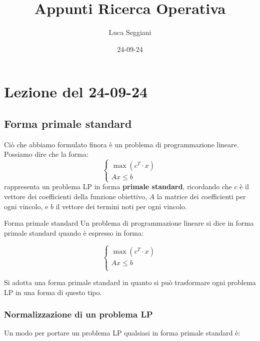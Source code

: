 \documentclass[a4paper,11pt]{article}
\title{Appunti Ricerca Operativa}
\author{Luca Seggiani}
\date{24-09-24}
\begin{document}
\section{Lezione del 24-09-24}

\thispagestyle{empty}
\pagestyle{fancy}


\subsection{Forma primale standard}
Ciò che abbiamo formulato finora è un problema di programmazione lineare.
Possiamo dire che la forma:
\[
	\begin{cases}
			\max(c^T \cdot x) \\
			A x \leq b
	\end{cases}
\]
rappresenta un problema LP in forma \textbf{primale standard}, ricordando che $c$ è il vettore dei coefficienti della funzione obiettivo, $A$ la matrice dei coefficienti per ogni vincolo, e $b$ il vettore dei termini noti per ogni vincolo.

\begin{definition}{Forma primale standard}
	Un problema di programmazione lineare si dice in forma primale standard quando è espresso in forma:
	
	\[
		\begin{cases}
			\max(c^T \cdot x) \\
			Ax \leq b \\
		\end{cases}
	\]

\end{definition}
\par\smallskip
Si adotta una forma primale standard in quanto si può trasformare ogni problema LP in una forma di questo tipo.

\subsubsection{Normalizzazione di un problema LP}
Un modo per portare un problema LP qualsiasi in forma primale standard è:
\end{document}
